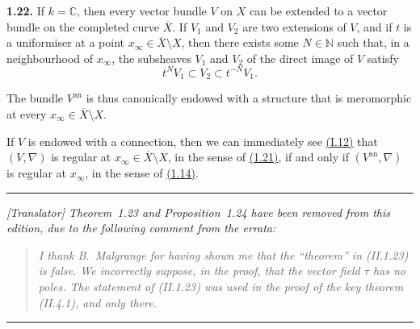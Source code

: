 \documentclass{report}
\newenvironment{itenv}[1]
  {\phantomsection\par\medskip\noindent\textbf{#1.}\itshape}
  {\medskip}
\newenvironment{rmenv}[1]
  {\phantomsection\par\medskip\noindent\textbf{#1.}\rmfamily}
  {\medskip}
\newcommand{\CC}{\mathbb{C}}
\newcommand{\NN}{\mathbb{N}}
\newcommand{\an}{\mathrm{an}}
\newcommand{\oldpage}[1]{\marginpar{\footnotesize$\Big\vert$ \textit{p.~#1}}}
\begin{document}
\begin{rmenv}{1.22}
\label{II.1.22}
  If $k=\CC$, then every vector bundle $V$ on $X$ can be extended to a vector bundle on the completed curve $\overline{X}$.
  If $V_1$ and $V_2$ are two extensions of $V$, and if $t$ is a uniformiser at a point $x_\infty\in\overline{X}\setminus X$, then there exists some $N\in\NN$ such that, in a neighbourhood of $x_\infty$, the subsheaves $V_1$ and $V_2$ of the direct image of $V$
\oldpage{58}
  satisfy
  \[
    t^N V_1\subset V_2 \subset t^{-N}V_1.
  \]

  The bundle $V^\an$ is thus canonically endowed with a structure that is meromorphic at every $x_\infty\in\overline{X}\setminus X$.

  If $V$ is endowed with a connection, then we can immediately see \hyperref[II.1.12]{(I.12)} that $(V,\nabla)$ is regular at $x_\infty\in\overline{X}\setminus X$, in the sense of \hyperref[II.1.21]{(1.21)}, if and only if $(V^\an,\nabla)$ is regular at $x_\infty$, in the sense of \hyperref[II.1.14]{(1.14)}.
\end{rmenv}

\medskip
\hrule
\medskip

\emph{[Translator] Theorem~1.23 and Proposition~1.24 have been removed from this edition, due to the following comment from the errata:}
\begin{quote}
  \itshape
  I thank B.~Malgrange for having shown me that the ``theorem'' in (II.1.23) is false.
  We incorrectly suppose, in the proof, that the vector field $\tau$ has no poles.
  The statement of (II.1.23) was used in the proof of the key theorem (II.4.1), and only there.
\end{quote}

\medskip
\hrule
\medskip


\end{document}

